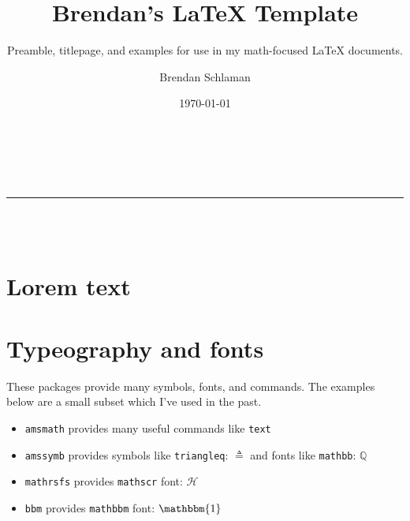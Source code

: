 \documentclass[titlepage]{article}
\title{Brendan's {\LaTeX} Template}
\subtitle{
    Preamble, titlepage, and examples for use in my math-focused {\LaTeX} documents.
}
\author{Brendan Schlaman}
\date{\today}
\newcommand{\QQ}{\mathbb{Q}}
\begin{document}
\begin{titlepage}
    \centering
    \vspace*{2in}

    {\LARGE \bfseries \thetitle}\\[2ex]
    {\small \thesubtitle}\\[2ex]
    \rule{\textwidth}{1pt}\\[8ex]
    {\Large \theauthor}\\[2ex]
    {\thedate}
\end{titlepage}

\tableofcontents
\newpage


\section{Lorem text}

\lipsum[1-2]


\section{Typeography and fonts}

These packages provide many symbols, fonts, and commands.
The examples below are a small subset which I've used in the past.
\begin{itemize}
    \item \texttt{amsmath} provides many useful commands like \texttt{text}
    \item \texttt{amssymb} provides symbols like
        \texttt{triangleq}: $\triangleq$
        and fonts like \texttt{mathbb}: $\QQ$
    \item \texttt{mathrsfs} provides \texttt{mathscr} font: $\mathscr{H}$
    \item \texttt{bbm} provides \texttt{mathbbm} font: $\mathbbm{1}$
\end{itemize}
\end{document}
